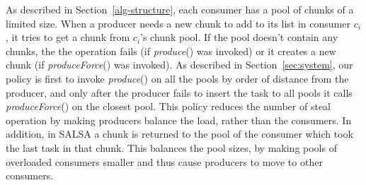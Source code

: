 As described in Section~\ref{alg-structure}, each consumer has a pool of chunks of a limited size.
When a producer needs a new chunk to add to its list in consumer $c_i$, it tries to get a chunk from $c_i$'s chunk pool. If the pool doesn't contain any chunks, the the operation fails (if {\it produce}() was invoked) or it creates a new chunk (if {\it produceForce}() was invoked). As described in Section~\ref{sec:system}, our policy is first to invoke {\it produce}() on all the pools by order of distance from the producer, and only after the producer fails to insert the task to all pools it calls {\it produceForce}() on the closest pool. This policy reduces the number of steal operation by making producers balance the load, rather than the consumers. In addition, in SALSA a chunk is returned to the pool of the consumer which took the last task in that chunk. This balances the pool sizes, by making pools of overloaded consumers smaller and thus cause producers to move to other consumers.